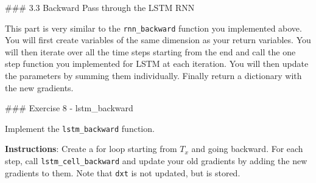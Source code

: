 \documentclass[11pt]{article}
\begin{document}
    \#\#\# 3.3 Backward Pass through the LSTM RNN

This part is very similar to the \texttt{rnn\_backward} function you
implemented above. You will first create variables of the same dimension
as your return variables. You will then iterate over all the time steps
starting from the end and call the one step function you implemented for
LSTM at each iteration. You will then update the parameters by summing
them individually. Finally return a dictionary with the new gradients.

\#\#\# Exercise 8 - lstm\_backward

Implement the \texttt{lstm\_backward} function.

\textbf{Instructions}: Create a for loop starting from \(T_x\) and going
backward. For each step, call \texttt{lstm\_cell\_backward} and update
your old gradients by adding the new gradients to them. Note that
\texttt{dxt} is not updated, but is stored.
\end{document}
